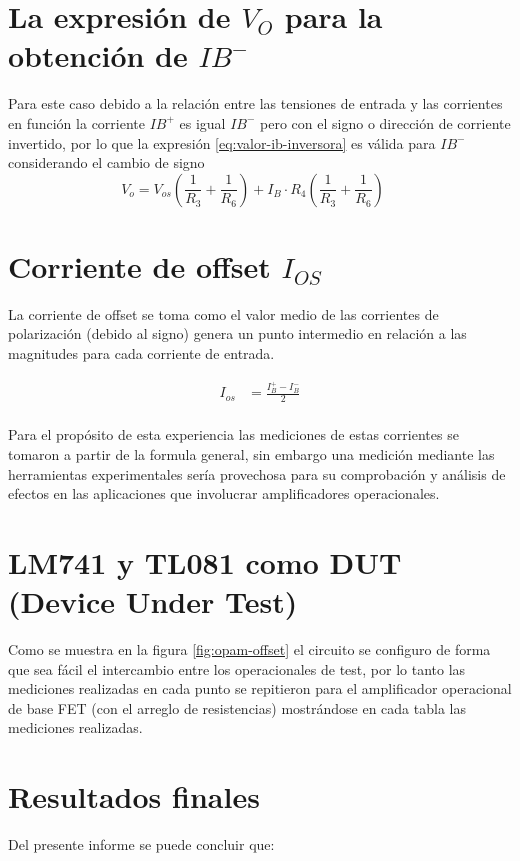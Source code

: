 \section{La expresión de $V_O$ para la obtención de $IB^-$}

Para este caso debido a la relación entre las tensiones de entrada y las corrientes en función \cite{horenstein2000circuitos} la corriente $IB^+$ es igual $IB^-$ pero con el signo o dirección de corriente invertido, por lo que la expresión \ref{eq:valor-ib-inversora} es válida para $IB^-$ considerando el cambio de signo
\begin{equation}
	V_o = V_{os}\left(\frac{1}{R_3} + \frac{1}{R_6}\right) + I_B \cdot R_4 \left(\frac{1}{R_3} + \frac{1}{R_6}\right) 
	\quad
	\label{eq:valor-ib-inversora}
\end{equation}

\section{Corriente de offset $I_{OS}$}

La corriente de offset se toma como el valor medio de las corrientes de polarización (debido al signo) genera un punto intermedio en relación a las magnitudes para cada corriente de entrada.

\begin{align}
	I_{os} &= \frac{I_B^+ - I_B^-}{2} \label{eq:ios} \\
\end{align}

Para el propósito de esta experiencia las mediciones de estas corrientes se tomaron a partir de la formula general, sin embargo una medición mediante las herramientas experimentales sería provechosa para su comprobación y análisis de efectos en las aplicaciones que involucrar amplificadores operacionales.

\section{LM741 y TL081 como DUT (Device Under Test)}

Como se muestra en la figura \ref{fig:opam-offset} el circuito se configuro de forma que sea fácil el intercambio entre los operacionales de test, por lo tanto las mediciones realizadas en cada punto se repitieron para el amplificador operacional de base FET (con el arreglo de resistencias) mostrándose en cada tabla las mediciones realizadas.

\section{Resultados finales}
Del presente informe se puede concluir que:

